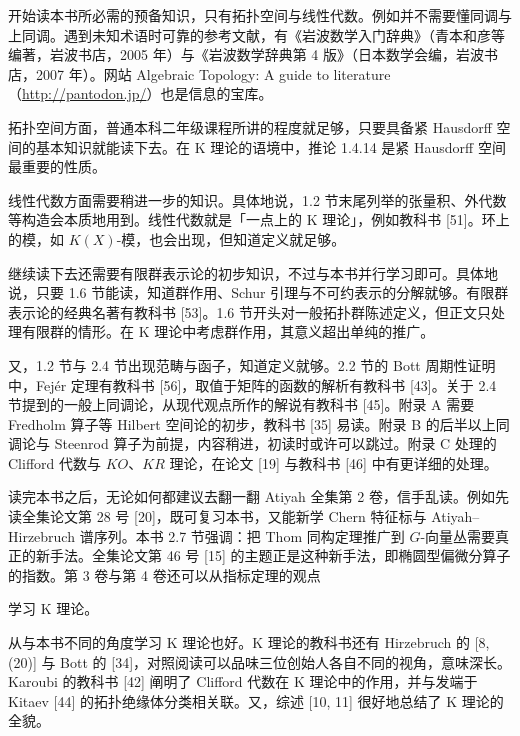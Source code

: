 
开始读本书所必需的预备知识，只有拓扑空间与线性代数。例如并不需要懂同调与上同调。遇到未知术语时可靠的参考文献，有《岩波数学入门辞典》（青本和彦等编著，岩波书店，2005 年）与《岩波数学辞典第 4 版》（日本数学会编，岩波书店，2007 年）。网站 Algebraic Topology: A guide to literature（\url{http://pantodon.jp/}）也是信息的宝库。

拓扑空间方面，普通本科二年级课程所讲的程度就足够，只要具备紧 Hausdorff 空间的基本知识就能读下去。在 K 理论的语境中，推论 1.4.14 是紧 Hausdorff 空间最重要的性质。

线性代数方面需要稍进一步的知识。具体地说，1.2 节末尾列举的张量积、外代数等构造会本质地用到。线性代数就是「一点上的 K 理论」，例如教科书 [51]。环上的模，如 $K(X)$-模，也会出现，但知道定义就足够。

继续读下去还需要有限群表示论的初步知识，不过与本书并行学习即可。具体地说，只要 1.6 节能读，知道群作用、Schur 引理与不可约表示的分解就够。有限群表示论的经典名著有教科书 [53]。1.6 节开头对一般拓扑群陈述定义，但正文只处理有限群的情形。在 K 理论中考虑群作用，其意义超出单纯的推广。

又，1.2 节与 2.4 节出现范畴与函子，知道定义就够。2.2 节的 Bott 周期性证明中，Fejér 定理有教科书 [56]，取值于矩阵的函数的解析有教科书 [43]。关于 2.4 节提到的一般上同调论，从现代观点所作的解说有教科书 [45]。附录 A 需要 Fredholm 算子等 Hilbert 空间论的初步，教科书 [35] 易读。附录 B 的后半以上同调论与 Steenrod 算子为前提，内容稍进，初读时或许可以跳过。附录 C 处理的 Clifford 代数与 $KO$、$KR$ 理论，在论文 [19] 与教科书 [46] 中有更详细的处理。


读完本书之后，无论如何都建议去翻一翻 Atiyah 全集第 2 卷，信手乱读。例如先读全集论文第 28 号 [20]，既可复习本书，又能新学 Chern 特征标与 Atiyah--Hirzebruch 谱序列。本书 2.7 节强调：把 Thom 同构定理推广到 $G$-向量丛需要真正的新手法。全集论文第 46 号 [15] 的主题正是这种新手法，即椭圆型偏微分算子的指数。第 3 卷与第 4 卷还可以从指标定理的观点

学习 K 理论。

从与本书不同的角度学习 K 理论也好。K 理论的教科书还有 Hirzebruch 的 [8, (20)] 与 Bott 的 [34]，对照阅读可以品味三位创始人各自不同的视角，意味深长。Karoubi 的教科书 [42] 阐明了 Clifford 代数在 K 理论中的作用，并与发端于 Kitaev [44] 的拓扑绝缘体分类相关联。又，综述 [10, 11] 很好地总结了 K 理论的全貌。


